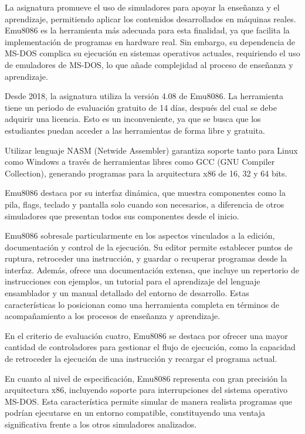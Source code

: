 \documentclass[12pt,oneside]{templates/unerthesis}
\begin{document}
La asignatura promueve el uso de simuladores para apoyar la enseñanza y el aprendizaje, permitiendo aplicar los contenidos desarrollados en máquinas reales. Emu8086 es la herramienta más adecuada para esta finalidad, ya que facilita la implementación de programas en hardware real. Sin embargo, su dependencia de MS-DOS complica su ejecución en sistemas operativos actuales, requiriendo el uso de emuladores de MS-DOS, lo que añade complejidad al proceso de enseñanza y aprendizaje.

Desde 2018, la asignatura utiliza la versión 4.08 de Emu8086. La herramienta tiene un periodo de evaluación gratuito de 14 días, después del cual se debe adquirir una licencia. Esto es un inconveniente, ya que se busca que los estudiantes puedan acceder a las herramientas de forma libre y gratuita.

Utilizar lenguaje NASM (Netwide Assembler) garantiza soporte tanto para Linux como Windows a través de herramientas libres como GCC (GNU Compiler Collection), generando programas para la arquitectura x86 de 16, 32 y 64 bits.

Emu8086 destaca por su interfaz dinámica, que muestra componentes como la pila, flags, teclado y pantalla solo cuando son necesarios, a diferencia de otros simuladores que presentan todos sus componentes desde el inicio.

Emu8086 sobresale particularmente en los aspectos vinculados a la edición, documentación y control de la ejecución. Su editor permite establecer puntos de ruptura, retroceder una instrucción, y guardar o recuperar programas desde la interfaz. Además, ofrece una documentación extensa, que incluye un repertorio de instrucciones con ejemplos, un tutorial para el aprendizaje del lenguaje ensamblador y un manual detallado del entorno de desarrollo. Estas características lo posicionan como una herramienta completa en términos de acompañamiento a los procesos de enseñanza y aprendizaje.

En el criterio de evaluación cuatro, Emu8086 se destaca por ofrecer una mayor cantidad de controladores para gestionar el flujo de ejecución, como la capacidad de retroceder la ejecución de una instrucción y recargar el programa actual.

En cuanto al nivel de especificación, Emu8086 representa con gran precisión la arquitectura x86, incluyendo soporte para interrupciones del sistema operativo MS-DOS. Esta característica permite simular de manera realista programas que podrían ejecutarse en un entorno compatible, constituyendo una ventaja significativa frente a los otros simuladores analizados.
\end{document}
